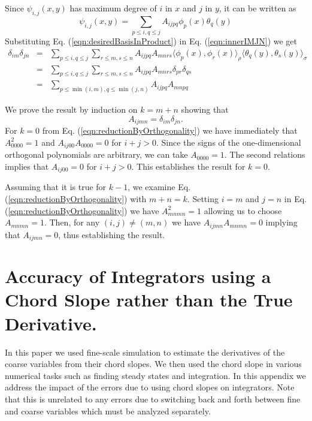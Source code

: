 \documentclass[numbers]{frontiersSCNS}
\newcommand{\basisFuncSymbol}{\psi}
\newcommand{\eqnRef}[1]{Eq. (\ref{eqn:#1})}
\begin{document}
Since $\basisFuncSymbol_{i,j} (x, y)$ has maximum degree of
$i$ in $x$ and $j$ in $y$,
it can be written as
\begin{equation}
    \label{eqn:desiredBasisInProduct}
    \basisFuncSymbol_{i,j}(x,y)
    =
    \sum_{p\le i, q\le j}
    A_{ijpq}\phi_p(x) \theta_q(y)
\end{equation}
Substituting \eqnRef{desiredBasisInProduct} in \eqnRef{innerIMJN}
we get
\begin{equation}
    \label{eqn:reductionByOrthogonality}
    \begin{array}{rcl}
    \delta_{im}\delta_{jn}
    &=&
    \sum_{p\le i, q\le j}
    \sum_{r\le m, s\le n}
    A_{ijpq} A_{mnrs}
    \langle \phi_p(x), \phi_r(x) \rangle_\rho
    \langle \theta_q(y), \theta_s(y) \rangle_\sigma
    \\
    &=&
    \sum_{p\le i, q\le j}
    \sum_{r\le m, s\le n}
    A_{ijpq} A_{mnrs}
    \delta_{pr} \delta_{qs}
    \\
    &=&
    \sum_{p\le\min(i,m), q\le\min(j,n)}
    A_{ijpq} A_{mnpq}
    \end{array}
\end{equation}


We prove the result by induction on $k=m+n$ showing that
$$A_{ijmn}=\delta_{im}\delta_{jn}.$$
For $k=0$ from \eqnRef{reductionByOrthogonality}
we have immediately that
$A^2_{0000}=1$ and $A_{ij00}A_{0000}=0$
for $i+j>0$.
%
Since the signs of the one-dimensional orthogonal polynomials
are arbitrary,
we can take $A_{0000}=1$.
%
The second relations implies that $A_{ij00}=0$
for
$i+j>0$.
%
This establishes the result for $k=0$.

Assuming that it is true for $k-1$,
we examine \eqnRef{reductionByOrthogonality} with $m+n=k$.
%
Setting $i=m$ and $j=n$ in \eqnRef{reductionByOrthogonality}
we have $A^2_{mnmn}=1$
allowing us to choose $A_{mnmn}=1$.
%
Then, for any $(i,j) \neq (m,n)$
we have $A_{ijmn}A_{mnmn}=0$
implying that $A_{ijmn}=0$,
thus establishing the result.

\section{Accuracy of Integrators using a Chord Slope rather than the True Derivative.}
\label{sec:appendixRKConv2}

In this paper we used fine-scale simulation to estimate the derivatives of the
coarse variables from their chord slopes.
%
We then used the chord slope in
various numerical tasks such as finding steady states and integration.
%
In this appendix we address the impact of the errors due to using chord
slopes on integrators.
%
Note that this is unrelated to any errors due to switching back and forth 
between fine and coarse variables which must be analyzed separately.
\end{document}
